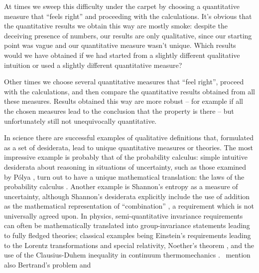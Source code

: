 \documentclass[\ifafour a4paper,12pt,\else a5paper,10pt,\fi%
onecolumn,oneside,article,%
british%
]{memoir}
\theoremstyle{remark}
\theoremstyle{innote}
\newcommand*{\citep}{\parencites}
\newcommand*{\citey}{\parencites*}
\renewcommand*{\|}{\mathpunct{|}}
\newcommand*{\sect}{\S}%
\newcommand*{\sects}{\S\S}%
\newcommand*{\chap}{ch.}%
\newcommand*{\eg}{{e.g.}}
\newcommand*{\cf}{{cf.}}
\newcommand*{\puzzle}{\maltese}
\newcommand{\mynote}[1]{ {\color{notecolour}\puzzle\ #1}}
\begin{document}
At times we sweep this difficulty under the carpet by choosing a
quantitative measure that \enquote{feels right} and proceeding with the
calculations. It's obvious that the quantitative results we obtain this way
are mostly smoke: despite the deceiving presence of numbers, our results
are only qualitative, since our starting point was vague and our
quantitative measure wasn't unique. Which results would we have obtained if
we had started from a slightly different qualitative intuition or used a
slightly different quantitative measure?

Other times we choose several quantitative measures that \enquote{feel
  right}, proceed with the calculations, and then compare the quantitative
results obtained from all these measures. Results obtained this way are
more robust -- for example if all the chosen measures lead to the
conclusion that the property is there -- but unfortunately still not
unequivocally quantitative.

In science there are successful examples of qualitative definitions that,
formulated as a set of desiderata, lead to unique quantitative measures or
theories. The most impressive example is probably that of the probability
calculus: simple intuitive desiderata about reasoning in situations of
uncertainty, such as those examined by P\'olya
\citey{polya1945_r1971,polya1949,polya1954,polya1954b_r1968}, turn out to
have a unique mathematical translation: the laws of the probability
calculus
\citep{cox1946,paris1994_r2006}[\chap~2]{jaynes1994_r2003}{snow1998,snow2001,dupreetal2009,tereninetal2015_r2017}[see
also][]{aczel2004b}. Another example is Shannon's entropy
\citep[\sect~6]{shannon1948} as a measure of uncertainty, although
Shannon's desiderata explicitly include the use of addition as the
mathematical representation of \enquote{combination}
\citep[\cf][\sect~11.3, p.~347]{jaynes1994_r2003}, a requirement which is
not universally agreed upon. In physics, semi-quantitative invariance
requirements can often be mathematically translated into group-invariance
statements leading to fully fledged theories; classical examples being
Einstein's requirements \citep[\sect~2]{einstein1905c} leading to the
Lorentz transformations and special relativity, Noether's theorem
\citep{noether1918}[anticipated for the Euclidean group
by][]{cosseratetal1909}, and the use of the Clausius-Duhem inequality in
continuum thermomechanics  \citep{colemanetal1963,coleman1964}[\eg\ \sects~2.2, 3.5]{samohyletal1987_r2014}. \mynote{mention also Bertrand's problem and}
\citep{jaynes1973b}
\end{document}
